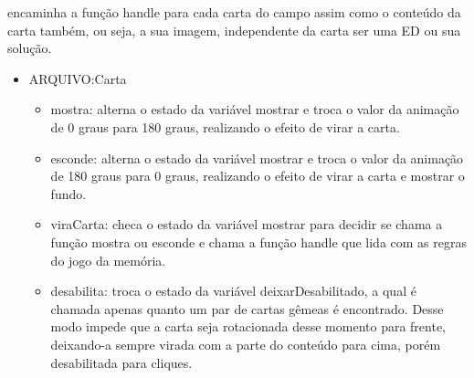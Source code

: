 	encaminha a função handle para cada carta do campo assim como o conteúdo da carta também, ou seja, a sua imagem, independente da carta ser uma ED ou sua solução.
 
\begin{itemize}
\item ARQUIVO:Carta
	\begin{itemize}
	\item mostra: alterna o estado da variável mostrar e troca o valor da animação de 0 graus para 180 graus, realizando o efeito de virar a carta.

	\item esconde: alterna o estado da variável mostrar e troca o valor da animação de 180 graus para 0 graus, realizando o efeito de virar a carta e mostrar o fundo.

	\item viraCarta: checa o estado da variável mostrar para decidir se chama a função mostra ou esconde e chama a função handle que lida com as regras do jogo da memória.

	\item desabilita: troca o estado da variável deixarDesabilitado, a qual é chamada apenas quanto um par de cartas gêmeas é encontrado. Desse modo impede que a carta seja rotacionada desse momento para frente, deixando-a sempre virada com a parte do conteúdo para cima, porém desabilitada para cliques.

	\end{itemize}
\end{itemize}
